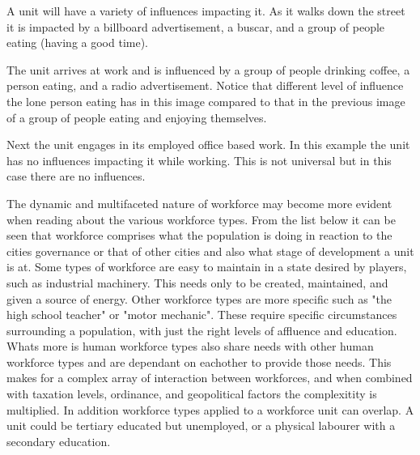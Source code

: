 A unit will have a variety of influences impacting it. As it walks down the street it is impacted by a billboard advertisement, a buscar, and a group of people eating (having a good time).

The unit arrives at work and is influenced by a group of people drinking coffee, a person eating, and a radio advertisement. Notice that different level of influence the lone person eating has in this image compared to that in the previous image of a group of people eating and enjoying themselves.

Next the unit engages in its employed office based work. In this example the unit has no influences impacting it while working. This is not universal but in this case there are no influences.














The dynamic and multifaceted nature of workforce may become more evident when reading about the various workforce types. From the list below it can be seen that workforce comprises what the population is doing in reaction to the cities governance or that of other cities and also what stage of development a unit is at. Some types of workforce are easy to maintain in a state desired by players, such as industrial machinery. This needs only to be created, maintained, and given a source of energy. Other workforce types are more specific such as "the high school teacher" or "motor mechanic". These require specific circumstances surrounding a population, with just the right levels of affluence and education. Whats more is human workforce types also share needs with other human workforce types and are dependant on eachother to provide those needs. This makes for a complex array of interaction between workforces, and when combined with taxation levels, ordinance, and geopolitical factors the complexitity is multiplied. In addition workforce types applied to a workforce unit can overlap. A unit could be tertiary educated but unemployed, or a physical labourer with a secondary education. 

